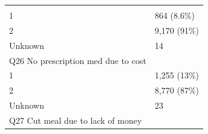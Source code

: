 \documentclass[]{article}
\begin{document}
\begin{longtable}[]{@{}ll@{}}
\begin{minipage}[t]{0.23\columnwidth}
\strut
\end{minipage}\tabularnewline
\begin{minipage}[t]{0.71\columnwidth}\raggedright
1\strut
\end{minipage} & \begin{minipage}[t]{0.23\columnwidth}\raggedright
864 (8.6\%)\strut
\end{minipage}\tabularnewline
\begin{minipage}[t]{0.71\columnwidth}\raggedright
2\strut
\end{minipage} & \begin{minipage}[t]{0.23\columnwidth}\raggedright
9,170 (91\%)\strut
\end{minipage}\tabularnewline
\begin{minipage}[t]{0.71\columnwidth}\raggedright
Unknown\strut
\end{minipage} & \begin{minipage}[t]{0.23\columnwidth}\raggedright
14\strut
\end{minipage}\tabularnewline
\begin{minipage}[t]{0.71\columnwidth}\raggedright
Q26 No prescription med due to cost\strut
\end{minipage} & \begin{minipage}[t]{0.23\columnwidth}\raggedright
\strut
\end{minipage}\tabularnewline
\begin{minipage}[t]{0.71\columnwidth}\raggedright
1\strut
\end{minipage} & \begin{minipage}[t]{0.23\columnwidth}\raggedright
1,255 (13\%)\strut
\end{minipage}\tabularnewline
\begin{minipage}[t]{0.71\columnwidth}\raggedright
2\strut
\end{minipage} & \begin{minipage}[t]{0.23\columnwidth}\raggedright
8,770 (87\%)\strut
\end{minipage}\tabularnewline
\begin{minipage}[t]{0.71\columnwidth}\raggedright
Unknown\strut
\end{minipage} & \begin{minipage}[t]{0.23\columnwidth}\raggedright
23\strut
\end{minipage}\tabularnewline
\begin{minipage}[t]{0.71\columnwidth}\raggedright
Q27 Cut meal due to lack of money\strut
\end{minipage} & \begin{minipage}[t]{0.23\columnwidth}\raggedright

\end{minipage}
\end{longtable}
\end{document}
